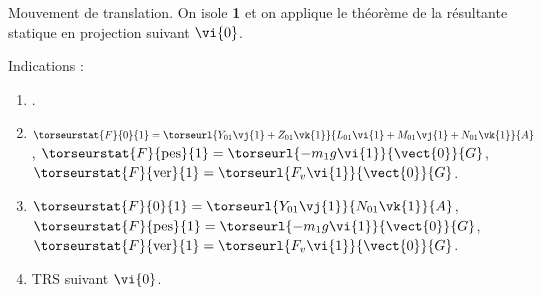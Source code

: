 \ifprof
Mouvement de translation. On isole \textbf{1} et on applique le théorème de la résultante statique en projection suivant $\vi{0}$.
\else
\fi



\ifprof
\else
\ifcolle
\else
\begin{solution}
Indications :
\begin{enumerate}
\item .
\item $\torseurstat{F}{0}{1}=\torseurl{Y_{01}\vj{1}+Z_{01}\vk{1}}{L_{01}\vi{1}+M_{01}\vj{1}+N_{01}\vk{1}}{A}$,
$\torseurstat{F}{\text{pes}}{1}=\torseurl{-m_1g\vi{1}}{\vect{0}}{G}$, 
$\torseurstat{F}{\text{ver}}{1}=\torseurl{F_v\vi{1}}{\vect{0}}{G}$.
\item $\torseurstat{F}{0}{1}=\torseurl{Y_{01}\vj{1}}{N_{01}\vk{1}}{A}$,
$\torseurstat{F}{\text{pes}}{1}=\torseurl{-m_1g\vi{1}}{\vect{0}}{G}$,
$\torseurstat{F}{\text{ver}}{1}=\torseurl{F_v\vi{1}}{\vect{0}}{G}$.
\item TRS suivant $\vi{0}$.
\end{enumerate}
\end{solution}

\fi
{}
\fi

